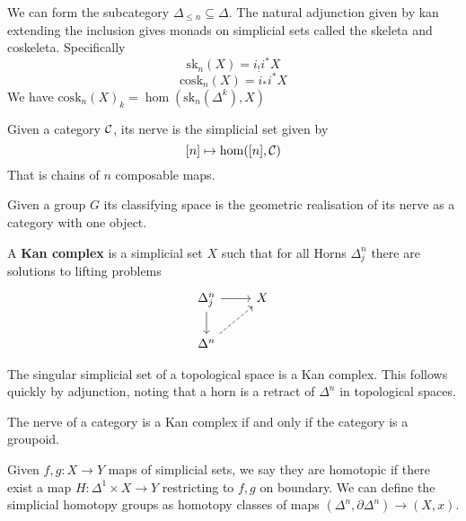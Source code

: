 \begin{definition}
    We can form the subcategory $\Delta_{\leq n} \subseteq \Delta$.
    The natural adjunction given by kan extending the inclusion gives monads on simplicial sets called the skeleta and coskeleta.
    Specifically
    \[\mathrm{sk}_n(X) = i_! i^\ast X \]
    \[\mathrm{cosk}_n(X) = i_* i^\ast X \]
    We have $\mathrm{cosk}_n(X)_k = \hom(\mathrm{sk}_n(\Delta^k), X)$
\end{definition}

\begin{definition}
    Given a category $\mathcal{C}$, its nerve is the simplicial set given by 
    \[ [n] \mapsto \hom([n], \mathcal{C}) \]
    That is chains of $n$ composable maps.
\end{definition}

\begin{definition}
    Given a group $G$ its classifying space is the geometric realisation of its nerve as a category with one object.
\end{definition}

\begin{definition}
    A \textbf{Kan complex} is a simplicial set $X$ such that for all Horns $\Delta^n_j$ there are solutions to lifting problems
    \[\begin{tikzcd}
        \Delta^n_j \ar[d] \ar[r] & X \\
        \Delta^n \ar[ur, dashed]
    \end{tikzcd}\]
\end{definition}

\begin{example}
    The singular simplicial set of a topological space is a Kan complex.
    This follows quickly by adjunction, noting that a horn is a retract of $\Delta^n$ in topological spaces.
\end{example}

\begin{example}
    The nerve of a category is a Kan complex if and only if the category is a groupoid.
\end{example}

\begin{definition}
    Given $f, g : X \to Y$ maps of simplicial sets, we say they are homotopic if there exist a map $H : \Delta^1 \times X \to Y$ restricting to $f, g$ on boundary.
    We can define the simplicial homotopy groups as homotopy classes of maps $(\Delta^n, \partial \Delta^n) \to (X, x)$.
\end{definition}


